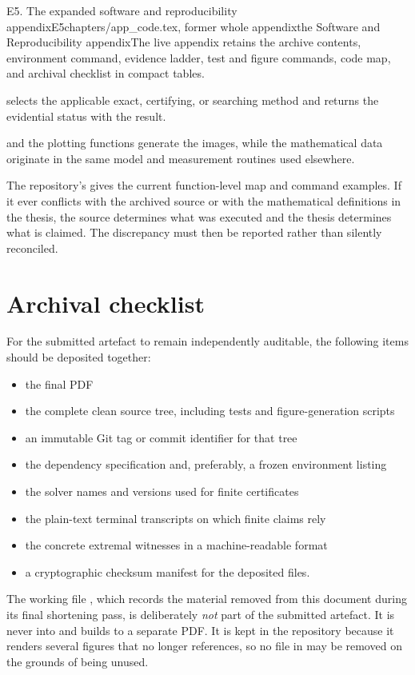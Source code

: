 \begin{offcut}{E5. The expanded software and reproducibility appendix}{E5}{chapters/app\_code.tex, former whole appendix}{the Software and Reproducibility appendix}{The live appendix retains the archive contents, environment command, evidence ladder, test and figure commands, code map, and archival checklist in compact tables.}
\begin{description}[style=nextline]
  \item[Unified entry point]
   selects the applicable exact, certifying, or searching method and returns the evidential status with the result.

  \item[Presentation]
   and the plotting functions generate the images, while the mathematical data originate in the same model and measurement routines used elsewhere.
\end{description}

The repository's  gives the current function-level map and command examples. If it ever conflicts with the archived source or with the mathematical definitions in the thesis, the source determines what was executed and the thesis determines what is claimed. The discrepancy must then be reported rather than silently reconciled.

\section{Archival checklist}

For the submitted artefact to remain independently auditable, the following items should be deposited together:

\begin{itemize}
  \item the final PDF
  \item the complete clean source tree, including tests and figure-generation scripts
  \item an immutable Git tag or commit identifier for that tree
  \item the dependency specification and, preferably, a frozen environment listing
  \item the solver names and versions used for finite certificates
  \item the plain-text terminal transcripts on which finite claims rely
  \item the concrete extremal witnesses in a machine-readable format
  \item a cryptographic checksum manifest for the deposited files.
\end{itemize}

The working file , which records the material removed from
this document during its final shortening pass, is deliberately \emph{not} part
of the submitted artefact. It is never  into
 and builds to a separate PDF. It is kept in the repository
because it renders several figures that  no longer references,
so no file in  may be removed on the grounds of being unused.


\end{offcut}
